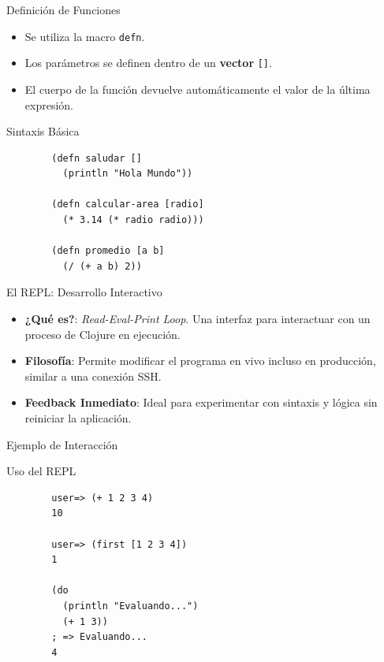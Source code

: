 \documentclass{beamer}
\begin{document}
\begin{frame}[fragile]{Definición de Funciones}
    \begin{itemize}
        \item Se utiliza la macro \texttt{defn}.
        \item Los parámetros se definen dentro de un \textbf{vector} \texttt{[]}.
        \item El cuerpo de la función devuelve automáticamente el valor de la última expresión.
    \end{itemize}

    \begin{exampleblock}{Sintaxis Básica}
        \begin{verbatim}
        (defn saludar []
          (println "Hola Mundo"))

        (defn calcular-area [radio]
          (* 3.14 (* radio radio)))

        (defn promedio [a b]
          (/ (+ a b) 2))
        \end{verbatim}
    \end{exampleblock}
\end{frame}

\begin{frame}[fragile]{El REPL: Desarrollo Interactivo}
    \begin{itemize}
        \item \textbf{¿Qué es?}: \textit{Read-Eval-Print Loop}. Una interfaz para interactuar con un proceso de Clojure en ejecución.
        \item \textbf{Filosofía}: Permite modificar el programa en vivo incluso en producción, similar a una conexión SSH.
        \item \textbf{Feedback Inmediato}: Ideal para experimentar con sintaxis y lógica sin reiniciar la aplicación.
    \end{itemize}

\end{frame}

\begin{frame}[fragile]{Ejemplo de Interacción}
        \begin{exampleblock}{Uso del REPL}
        \begin{verbatim}
        user=> (+ 1 2 3 4)
        10

        user=> (first [1 2 3 4])
        1

        (do 
          (println "Evaluando...")
          (+ 1 3))
        ; => Evaluando...
        4
        \end{verbatim}
    \end{exampleblock}
\end{frame}
\end{document}
